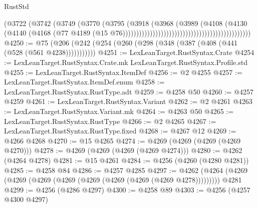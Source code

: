 \begin{lexlean}{RustStd}
\begin{coremodule}
                                                                      (@3722
                                                                        (@3742
                                                                          (@3749
                                                                            (@3770
                                                                              (@3795
                                                                                (@3918
                                                                                  (@3968
                                                                                    (@3989
                                                                                      (@4108
                                                                                        (@4130
                                                                                          (@4140
                                                                                            (@4168
                                                                                              (@77
                                                                                                @4189
                                                                                                (@15
                                                                                                  @76)))))))))))))))))))))))))))))))))))))))))))))))
@4250 := @75 (@206 (@242 (@254 (@260 (@298 (@348 (@387 (@408 (@441 (@528 (@561 @4238)))))))))))
@4251 := LexLeanTarget.RustSyntax.Crate
@4254 := LexLeanTarget.RustSyntax.Crate.mk LexLeanTarget.RustSyntax.Profile.std
@4255 := LexLeanTarget.RustSyntax.ItemDef
@4256 := @2 @4255
@4257 := LexLeanTarget.RustSyntax.ItemDef.enum
@4258 := LexLeanTarget.RustSyntax.RustType.adt
@4259 := @4258 @50
@4260 := @4257 @4259
@4261 := LexLeanTarget.RustSyntax.Variant
@4262 := @2 @4261
@4263 := LexLeanTarget.RustSyntax.Variant.mk
@4264 := @4263 @50
@4265 := LexLeanTarget.RustSyntax.RustType
@4266 := @2 @4265
@4267 := LexLeanTarget.RustSyntax.RustType.fixed
@4268 := @4267 @12
@4269 := @4266 @4268
@4270 := @15 @4265
@4274 := @4269 (@4269 (@4269 (@4269 @4270)))
@4278 := @4269 (@4269 (@4269 (@4269 @4274)))
@4280 := @4262 (@4264 @4278)
@4281 := @15 @4261
@4284 := @4256 (@4260 (@4280 @4281))
@4285 := @4258 @84
@4286 := @4257 @4285
@4297 := @4262 (@4264 (@4269 (@4269 (@4269 (@4269 (@4269 (@4269 (@4269 (@4269 @4278))))))))) @4281
@4299 := @4256 (@4286 @4297)
@4300 := @4258 @89
@4303 := @4256 (@4257 @4300 @4297)

\end{coremodule}
\end{lexlean}
